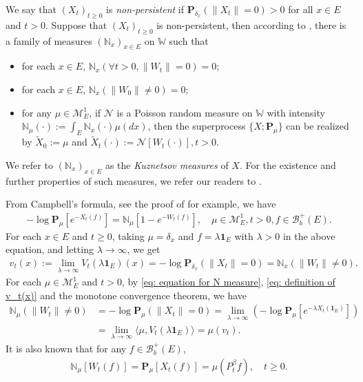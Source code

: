 \documentclass[12pt,a4paper]{amsart}
\theoremstyle{definition}
\numberwithin{equation}{section}
\begin{document}
We say that $(X_t)_{t\geq 0}$ is \emph{non-persistent} if $\mathbf P_{\delta_x}(\|X_t\|= 0) > 0$ for all $x\in E$ and $t> 0$.
Suppose that $(X_t)_{t\geq 0}$ is non-persistent, then according to \cite[Section 8.4]{Li2011Measure-valued}, there is a family of measures $(\mathbb N_x)_{x\in E}$ on $\mathbb W$ such that
\begin{itemize}
\item
	for each $x\in E$, $\mathbb N_x (\forall t > 0, \|W_t\|=0) =0$;
\item
	for each $x\in E$, $\mathbb N_x(\|W_0 \|\neq 0) = 0$;
\item
	for any $\mu \in \mathcal M_E^1$, if $\mathcal N$ is a Poisson random measure on $\mathbb W$ with intensity $\mathbb N_\mu(\cdot):= \int_E \mathbb N_x(\cdot )\mu(dx)$, then the superprocess $\{X;\mathbf P_\mu\}$ can be realized by $\widetilde X_0 := \mu$ and $\widetilde X_t(\cdot) := \mathcal N[W_t(\cdot)],t>0$.
\end{itemize}
We refer to $(\mathbb N_x)_{x\in E}$ as the \emph{Kuznetsov measures} of $X$.
For the existence and further properties of such measures, we refer our readers to \cite{Li2011Measure-valued}.

From  Campbell's formula, see  the proof of \cite[Theorem 2.7]{Kyprianou2014Fluctuations} for example, we have
\begin{align} \label{eq: equation for N measure}
	- \log \mathbf P_\mu [e^{-X_t(f)}]
	= \mathbb N_\mu[ 1-e^{- W_t(f)}],
	\quad \mu \in \mathcal M_E^1, t>0, f\in \mathscr B_b^+(E).
\end{align}
For each $x\in E$ and $t\geq 0$, taking $\mu = \delta_x$ and $f = \lambda \mathbf 1_E$ with $\lambda > 0$ in the above equation, and letting $\lambda \to \infty$, we get
\begin{align} \label{eq: definition of v_t(x)}
	v_t(x)
	:= \lim_{\lambda\to \infty} V_t(\lambda\mathbf 1_E)(x)
	= -\log \mathbf P_{\delta_x} (\|X_t\|=0)
	= \mathbb N_x(\|W_t\|\neq 0).
\end{align}
For each $\mu \in \mathcal M_E^1$ and $t > 0$, by \eqref{eq: equation for N measure}, \eqref{eq: definition of v_t(x)} and the monotone convergence theorem, we have
\begin{align}
  \mathbb N_\mu(\|W_t\|\neq 0)
	&= -\log \mathbf P_{\mu} (\|X_t\|=0)
   = \lim_{\lambda \to \infty} (- \log \mathbf P_\mu [e^{-\lambda X_t(\mathbf 1_E)}])
	\\\label{eq: equation for mu v-t}
	&= \lim_{\lambda \to \infty} \langle \mu, V_t(\lambda \mathbf 1_E)\rangle
   = \mu(v_t).
\end{align}
It is also known that for any $f\in\mathscr B_b^+(E)$,
\begin{align}\label{eq: mean of kuz measure}
  \mathbb N_{\mu}[W_t(f)]
  =\mathbf P_{\mu}[X_t(f)]=\mu(P^\beta_tf),
  \quad t \geq 0.
  \end{align}
\end{document}
